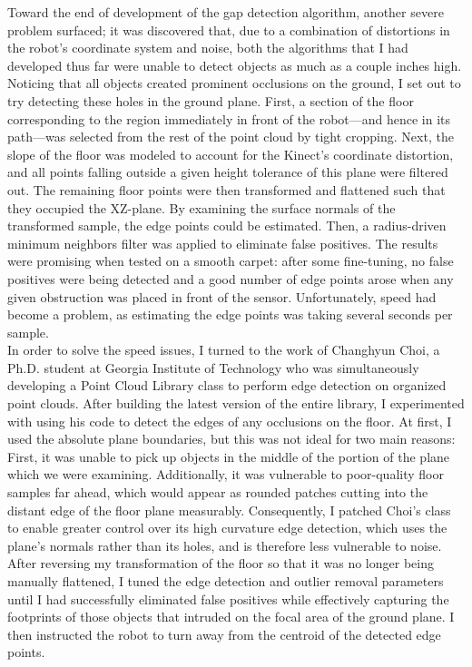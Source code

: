 \documentclass[12pt]{report}
\begin{document}
Toward the end of development of the gap detection algorithm, another severe problem surfaced; it was discovered that, due to a combination of distortions in the robot's coordinate system and noise, both the algorithms that I had developed thus far were unable to detect objects as much as a couple inches high.  Noticing that all objects created prominent occlusions on the ground, I set out to try detecting these holes in the ground plane.  First, a section of the floor corresponding to the region immediately in front of the robot---and hence in its path---was selected from the rest of the point cloud by tight cropping.  Next, the slope of the floor was modeled to account for the Kinect's coordinate distortion, and all points falling outside a given height tolerance of this plane were filtered out.  The remaining floor points were then transformed and flattened such that they occupied the XZ-plane.  By examining the surface normals of the transformed sample, the edge points could be estimated.  Then, a radius-driven minimum neighbors filter was applied to eliminate false positives.  The results were promising when tested on a smooth carpet: after some fine-tuning, no false positives were being detected and a good number of edge points arose when any given obstruction was placed in front of the sensor.  Unfortunately, speed had become a problem, as estimating the edge points was taking several seconds per sample. \\
In order to solve the speed issues, I turned to the work of Changhyun Choi, a Ph.D. student at Georgia Institute of Technology who was simultaneously developing a Point Cloud Library class to perform edge detection on organized point clouds.  After building the latest version of the entire library, I experimented with using his code to detect the edges of any occlusions on the floor.  At first, I used the absolute plane boundaries, but this was not ideal for two main reasons:  First, it was unable to pick up objects in the middle of the portion of the plane which we were examining.  Additionally, it was vulnerable to poor-quality floor samples far ahead, which would appear as rounded patches cutting into the distant edge of the floor plane measurably.  Consequently, I patched Choi's class to enable greater control over its high curvature edge detection, which uses the plane's normals rather than its holes, and is therefore less vulnerable to noise.  After reversing my transformation of the floor so that it was no longer being manually flattened, I tuned the edge detection and outlier removal parameters until I had successfully eliminated false positives while effectively capturing the footprints of those objects that intruded on the focal area of the ground plane.  I then instructed the robot to turn away from the centroid of the detected edge points. \\
\end{document}
